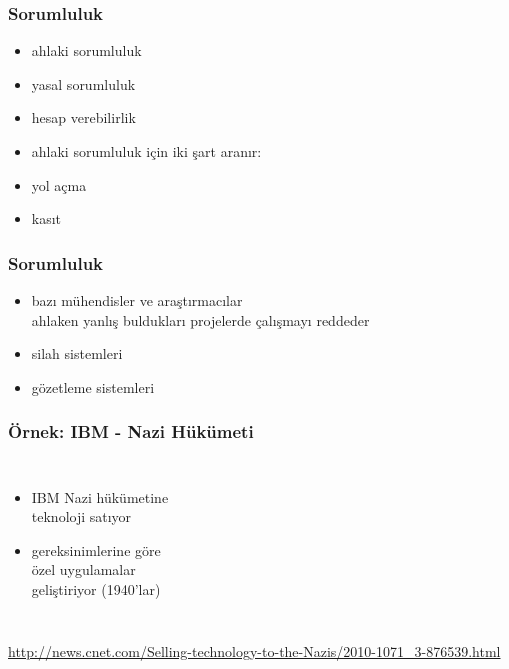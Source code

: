 \documentclass[dvipsnames]{beamer}
\theoremstyle{plain}
\begin{document}
\begin{frame}
  \frametitle{Sorumluluk}

  \begin{itemize}
    \item ahlaki sorumluluk
    \item yasal sorumluluk
    \smallskip
    \item hesap verebilirlik

    \pause
    \bigskip
    \item ahlaki sorumluluk için iki şart aranır:
    \smallskip
    \item yol açma
    \item kasıt
  \end{itemize}
\end{frame}

\begin{frame}
  \frametitle{Sorumluluk}

  \begin{itemize}
    \item bazı mühendisler ve araştırmacılar\\
      ahlaken yanlış buldukları projelerde çalışmayı reddeder

    \medskip
    \item silah sistemleri
    \item gözetleme sistemleri
  \end{itemize}
\end{frame}

\begin{frame}
  \frametitle{Örnek: IBM - Nazi Hükümeti}

  \begin{columns}

    \begin{itemize}
      \item IBM Nazi hükümetine\\
        teknoloji satıyor
      \item gereksinimlerine göre\\
        özel uygulamalar\\
        geliştiriyor (1940'lar)
    \end{itemize}
  \end{columns}

  \medskip
  \tiny{\url{http://news.cnet.com/Selling-technology-to-the-Nazis/2010-1071_3-876539.html}}\\
\end{frame}
\end{document}
